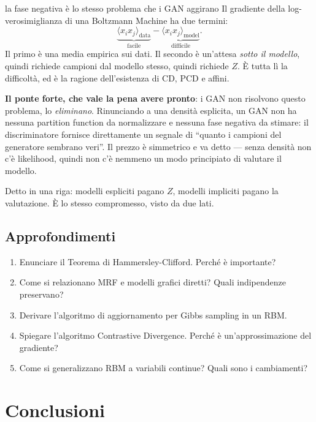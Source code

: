 \begin{trappola}{la fase negativa è lo stesso problema che i GAN aggirano}
Il gradiente della log-verosimiglianza di una Boltzmann Machine ha due termini:
\[
\underbrace{\langle x_i x_j\rangle_{\text{data}}}_{\text{facile}} - \underbrace{\langle x_i x_j\rangle_{\text{model}}}_{\text{difficile}}.
\]
Il primo è una media empirica sui dati. Il secondo è un'attesa \emph{sotto il modello}, quindi richiede campioni dal modello stesso, quindi richiede $Z$. È tutta lì la difficoltà, ed è la ragione dell'esistenza di CD, PCD e affini.

\textbf{Il ponte forte, che vale la pena avere pronto}: i GAN non risolvono questo problema, lo \emph{eliminano}. Rinunciando a una densità esplicita, un GAN non ha nessuna partition function da normalizzare e nessuna fase negativa da stimare: il discriminatore fornisce direttamente un segnale di ``quanto i campioni del generatore sembrano veri''. Il prezzo è simmetrico e va detto — senza densità non c'è likelihood, quindi non c'è nemmeno un modo principiato di valutare il modello.

Detto in una riga: modelli espliciti pagano $Z$, modelli impliciti pagano la valutazione. È lo stesso compromesso, visto da due lati.
\end{trappola}



\section{Approfondimenti}

\begin{tcolorbox}[title=Domande d'Esame]
  \begin{enumerate}
    \item Enunciare il Teorema di Hammersley-Clifford. Perché è importante?
    \item Come si relazionano MRF e modelli grafici diretti? Quali indipendenze preservano?
    \item Derivare l'algoritmo di aggiornamento per Gibbs sampling in un RBM.
    \item Spiegare l'algoritmo Contrastive Divergence. Perché è un'approssimazione del gradiente?
    \item Come si generalizzano RBM a variabili continue? Quali sono i cambiamenti?
  \end{enumerate}
\end{tcolorbox}

\chapter*{Conclusioni}

